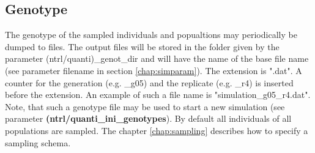 \documentclass[letterpaper,12pt,oneside]{book}
\begin{document}
\subsection{Genotype}\label{genoQuanti}
The genotype of the sampled individuals and popualtions may periodically be dumped to files. The output files will be stored in the folder given by the parameter \textsf{(ntrl/quanti)\_genot\_dir} and will have the name of the base file name (see parameter \textsf{filename} in section \ref{chap:simparam}). The extension is ".dat". A counter for the generation (e.g. \_g05) and the replicate (e.g. \_r4) is inserted before the extension. An example of such a file name is \textsf{"simulation\_g05\_r4.dat"}. Note, that such a genotype file may be used to start a new simulation (see parameter \textbf{(ntrl/quanti\_ini\_genotypes}). By default all individuals of all populations are sampled. The chapter \ref{chap:sampling} describes how to specify a sampling schema.
\end{document}
